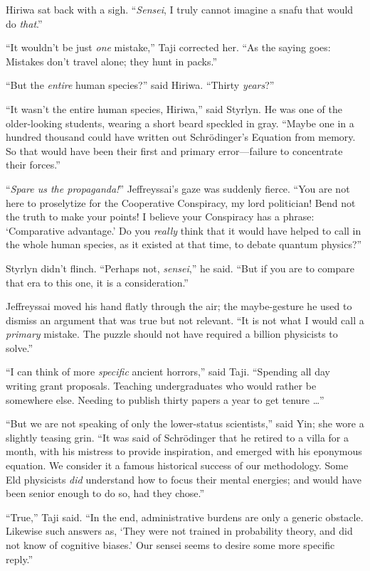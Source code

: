{
 Hiriwa sat back with a sigh. ``\textit{Sensei}, I
truly cannot imagine a snafu that would do
\textit{that}.''}

{
 ``It wouldn't be just
\textit{one} mistake,'' Taji corrected her.
``As the saying goes: Mistakes don't
travel alone; they hunt in packs.''}

{
 ``But the \textit{entire} human
species?'' said Hiriwa. ``Thirty
\textit{years}?''}

{
 ``It wasn't the entire human
species, Hiriwa,'' said Styrlyn. He was one of the
older-looking students, wearing a short beard speckled in gray.
``Maybe one in a hundred thousand could have written
out Schrödinger's Equation from memory. So that would
have been their first and primary error---failure to concentrate their
forces.''}

{
 ``\textit{Spare us the
propaganda!}'' Jeffreyssai's gaze was
suddenly fierce. ``You are not here to proselytize for
the Cooperative Conspiracy, my lord politician! Bend not the truth to
make your points! I believe your Conspiracy has a phrase:
`Comparative advantage.' Do you
\textit{really} think that it would have helped to call in the whole
human species, as it existed at that time, to debate quantum
physics?''}

{
 Styrlyn didn't flinch. ``Perhaps
not, \textit{sensei},'' he said.
``But if you are to compare that era to this one, it
is a consideration.''}

{
 Jeffreyssai moved his hand flatly through the air; the
maybe-gesture he used to dismiss an argument that was true but not
relevant. ``It is not what I would call a
\textit{primary} mistake. The puzzle should not have required a billion
physicists to solve.''}

{
 ``I can think of more \textit{specific} ancient
horrors,'' said Taji. ``Spending all
day writing grant proposals. Teaching undergraduates who would rather
be somewhere else. Needing to publish thirty papers a year to get
tenure \ldots''}

{
 ``But we are not speaking of only the
lower-status scientists,'' said Yin; she wore a
slightly teasing grin. ``It was said of Schrödinger
that he retired to a villa for a month, with his mistress to provide
inspiration, and emerged with his eponymous equation. We consider it a
famous historical success of our methodology. Some Eld physicists
\textit{did} understand how to focus their mental energies; and would
have been senior enough to do so, had they chose.''}

{
 ``True,'' Taji said.
``In the end, administrative burdens are only a
generic obstacle. Likewise such answers as, `They were
not trained in probability theory, and did not know of cognitive
biases.' Our sensei seems to desire some more specific
reply.''}

